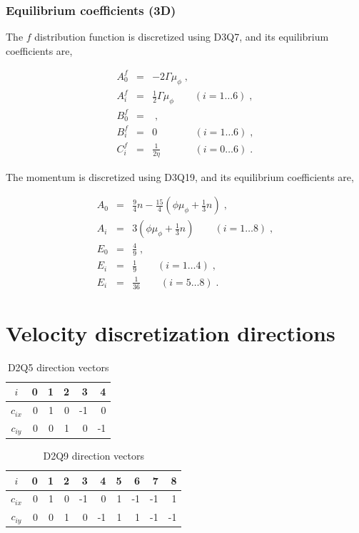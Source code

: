 \documentclass[12pt]{report}
\begin{document}
\subsubsection*{Equilibrium coefficients (3D)}
The $f$ distribution function is discretized using D3Q7, and its equilibrium coefficients are,

\begin{eqnarray}
A_0^f &=& -2\Gamma\mu_\phi\;,\\
A_i^f &=& \frac{1}{2}\Gamma\mu_\phi \quad\quad  (i=1 \ldots 6)\;,\\
B_0^f &=& \;,\\
B_i^f &=& 0\phantom{1_3}\phantom{\frac{1}{22}} \quad\quad (i=1 \ldots 6)\;,\\
C_i^f &=& \frac{1}{2\eta}\phantom{12_3} \quad\quad (i=0 \ldots 6)\;. 
\end{eqnarray}

The momentum is discretized using D3Q19, and its equilibrium coefficients are,

\begin{eqnarray}
A_0 &=& \frac{9}{4}n-\frac{15}{4}(\phi\mu_{\phi}+\frac{1}{3}n)\;,\\
A_i &=& 3(\phi\mu_{\phi}+\frac{1}{3}n) \quad\quad (i = 1 \ldots 8)\;,\\
E_0 &=& \frac{4}{9}\;,\\
E_i &=& \frac{1}{9} \quad\quad (i = 1  \ldots 4)\;,\\
E_i &=& \frac{1}{36} \quad\quad (i = 5 \ldots 8)\;.
\end{eqnarray}

\section{Velocity discretization directions}

\setlength{\tabcolsep}{4pt}
\begin{table}[h]\footnotesize
  \centering
\begin{tabular}{|c|r|r|r|r|r|}\hline
       $i$ & 0 & 1 & 2 &  3 &  4\\\hline\hline
  $c_{ix}$ & 0 & 1 & 0 & -1 &  0\\
  $c_{iy}$ & 0 & 0 & 1 &  0 & -1\\\hline
\end{tabular}
 \caption{D2Q5 direction vectors}
\end{table}

\setlength{\tabcolsep}{4pt}
\begin{table}[h]\footnotesize
  \centering
\begin{tabular}{|c|r|r|r|r|r|r|r|r|r|}\hline
       $i$ & 0 & 1 & 2 &  3 &  4 & 5 &  6 &  7 &  8\\\hline\hline
  $c_{ix}$ & 0 & 1 & 0 & -1 &  0 & 1 & -1 & -1 &  1 \\
  $c_{iy}$ & 0 & 0 & 1 &  0 & -1 & 1 &  1 & -1 & -1 \\\hline
\end{tabular}
 \caption{D2Q9 direction vectors}
\end{table}
\end{document}
